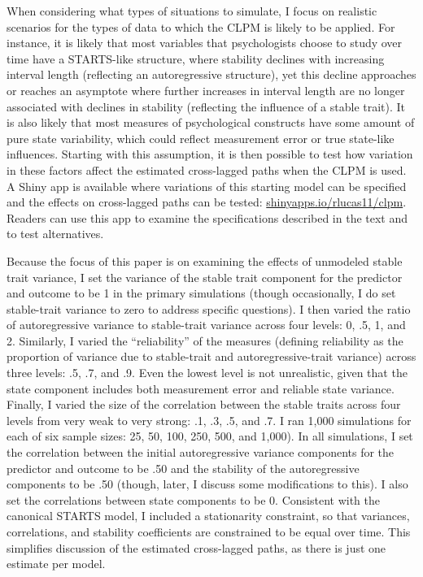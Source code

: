 \documentclass[
  english,
  man,floatsintext]{apa6}
\begin{document}
When considering what types of situations to simulate, I focus on realistic scenarios for the types of data to which the CLPM is likely to be applied. For instance, it is likely that most variables that psychologists choose to study over time have a STARTS-like structure, where stability declines with increasing interval length (reflecting an autoregressive structure), yet this decline approaches or reaches an asymptote where further increases in interval length are no longer associated with declines in stability (reflecting the influence of a stable trait). It is also likely that most measures of psychological constructs have some amount of pure state variability, which could reflect measurement error or true state-like influences. Starting with this assumption, it is then possible to test how variation in these factors affect the estimated cross-lagged paths when the CLPM is used. A Shiny app is available where variations of this starting model can be specified and the effects on cross-lagged paths can be tested: \href{https://shinyapps.io/rlucas11/clpm}{shinyapps.io/rlucas11/clpm}. Readers can use this app to examine the specifications described in the text and to test alternatives.

Because the focus of this paper is on examining the effects of unmodeled stable trait variance, I set the variance of the stable trait component for the predictor and outcome to be 1 in the primary simulations (though occasionally, I do set stable-trait variance to zero to address specific questions). I then varied the ratio of autoregressive variance to stable-trait variance across four levels: 0, .5, 1, and 2. Similarly, I varied the ``reliability'' of the measures (defining reliability as the proportion of variance due to stable-trait and autoregressive-trait variance) across three levels: .5, .7, and .9. Even the lowest level is not unrealistic, given that the state component includes both measurement error and reliable state variance. Finally, I varied the size of the correlation between the stable traits across four levels from very weak to very strong: .1, .3, .5, and .7. I ran 1,000 simulations for each of six sample sizes: 25, 50, 100, 250, 500, and 1,000). In all simulations, I set the correlation between the initial autoregressive variance components for the predictor and outcome to be .50 and the stability of the autoregressive components to be .50 (though, later, I discuss some modifications to this). I also set the correlations between state components to be 0. Consistent with the canonical STARTS model, I included a stationarity constraint, so that variances, correlations, and stability coefficients are constrained to be equal over time. This simplifies discussion of the estimated cross-lagged paths, as there is just one estimate per model.
\end{document}
